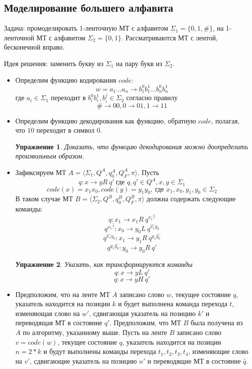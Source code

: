 \documentclass[a4paper, 12pt]{extarticle}
\newtheorem*{homework}{Упражнение}
\newcommand{\MTRule}[4]{#1 \rightarrow #2 #3 \ #4}
\begin{document}
\subsection*{Моделирование б\textit{о}льшего алфавита}
Задача: промоделировать 1-ленточную МТ с алфавитом $\Sigma_1 = \{0, 1, \#\}$, на 1-ленточной МТ с алфавитом $\Sigma_2 = \{0, 1\}$.
Рассматриваются МТ с лентой, бесконечной вправо.

Идея решения: заменить букву из $\Sigma_1$ на пару букв из $\Sigma_2$.

\begin{itemize}
 \item Определим функцию кодирования $code$:
 $$w = a_1...a_n \rightarrow b_1^0b_1^1...b_n^0b_n^1$$
 где $a_i \in \Sigma_1$ переходит в $b_i^0b_i^1, b_i^j\in \Sigma_2$ согласно правилу 
 $$\# \rightarrow 00, 0 \rightarrow 01, 1 \rightarrow 11$$
 
 \item Определим функцию декодирования как функцию, обратную $code$, полагая, что $10$ переходит в символ $0$. 
 
 \begin{homework}
 Доказать, что  функцию декодирования можно доопределить произвольным образом. 
 \end{homework} 
 
 \item Зафиксируем МТ $A = \langle \Sigma_1, Q^A, q_0^A, Q_F^A, \pi\rangle$. Пусть
  $$q: \MTRule{x}{y}{R}{q'}\ \text{где } q, q' \in Q^A, x, y \in \Sigma_1$$  
  $$code(x) = x_1x_0, code(y) = y_1y_0,\ \text{где } x_1, x_0, y_1, y_0 \in \Sigma_2$$
  В таком случае МТ $B = \langle \Sigma_2, Q^B, q_0^B, Q_F^B, \pi\rangle$ должна содержать следующие команды:
  $$ q               : \MTRule{x_1}{x_1}{R}{q^{x_1\hat{?}}} $$
  $$ q^{x_1\hat{?}}  : \MTRule{x_0}{y_0}{L}{q^{\hat{x_1}y_0}} $$
  $$ q^{\hat{x_1}y_0}: \MTRule{x_1}{y_1}{R}{q^{y_1\hat{y_0}}} $$
  $$ q^{y_1\hat{y_0}}: \MTRule{y_0}{y_0}{R}{q'} $$
  
  \begin{homework}
  Указать, как трансформируются команды
  $$q: \MTRule{x}{y}{L}{q'}$$
  $$q: \MTRule{x}{y}{H}{q'}$$   
  \end{homework}
 
  \item Предположим, что на ленте МТ $A$ записано слово $w$, текущее состояние $q$, указатель находится на позиции $k$ и 
  будет выполнена команда перехода $t$, изменяющая слово на $w'$, сдвигающая указатель на позицию $k'$ и переводящая МТ в состояние $q'$.
  Предположим, что МТ $B$ была получена из $A$ по алгоритму, указанному выше. Пусть на ленте $B$ записано слово $v = code(w)$,
  текущее состояние $q$, указатель находится на позиции $n = 2 * k$ и будут выполнены команды
  перехода $t_1, t_2, t_3, t_4$, изменяющие слово на $v'$, сдвигающие указатель на позицию $n'$ и переводящие МТ в состояние $\hat{q}$.


\end{itemize}
\end{document}

